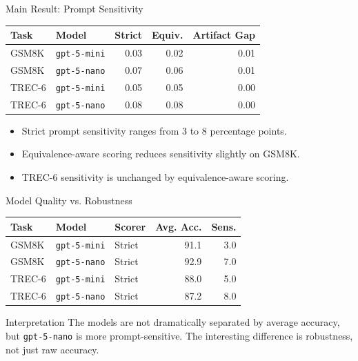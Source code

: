 \documentclass[aspectratio=169,11pt]{beamer}
\begin{document}
\begin{frame}{Main Result: Prompt Sensitivity}
  \begin{table}
    \centering
    \begin{tabular}{llrrr}
      \toprule
      Task & Model & Strict & Equiv. & Artifact Gap \\
      \midrule
      GSM8K & \texttt{gpt-5-mini} & 0.03 & 0.02 & 0.01 \\
      GSM8K & \texttt{gpt-5-nano} & 0.07 & 0.06 & 0.01 \\
      TREC-6 & \texttt{gpt-5-mini} & 0.05 & 0.05 & 0.00 \\
      TREC-6 & \texttt{gpt-5-nano} & 0.08 & 0.08 & 0.00 \\
      \bottomrule
    \end{tabular}
  \end{table}

  \begin{itemize}
    \item Strict prompt sensitivity ranges from 3 to 8 percentage points.
    \item Equivalence-aware scoring reduces sensitivity slightly on GSM8K.
    \item TREC-6 sensitivity is unchanged by equivalence-aware scoring.
  \end{itemize}
\end{frame}

\begin{frame}{Model Quality vs. Robustness}
  \begin{table}
    \centering
    \small
    \begin{tabular}{lllrr}
      \toprule
      Task & Model & Scorer & Avg. Acc. & Sens. \\
      \midrule
      GSM8K & \texttt{gpt-5-mini} & Strict & 91.1 & 3.0 \\
      GSM8K & \texttt{gpt-5-nano} & Strict & 92.9 & 7.0 \\
      TREC-6 & \texttt{gpt-5-mini} & Strict & 88.0 & 5.0 \\
      TREC-6 & \texttt{gpt-5-nano} & Strict & 87.2 & 8.0 \\
      \bottomrule
    \end{tabular}
  \end{table}

  \begin{block}{Interpretation}
    The models are not dramatically separated by average accuracy, but \texttt{gpt-5-nano} is more prompt-sensitive. The interesting difference is robustness, not just raw accuracy.
  \end{block}
\end{frame}
\end{document}
